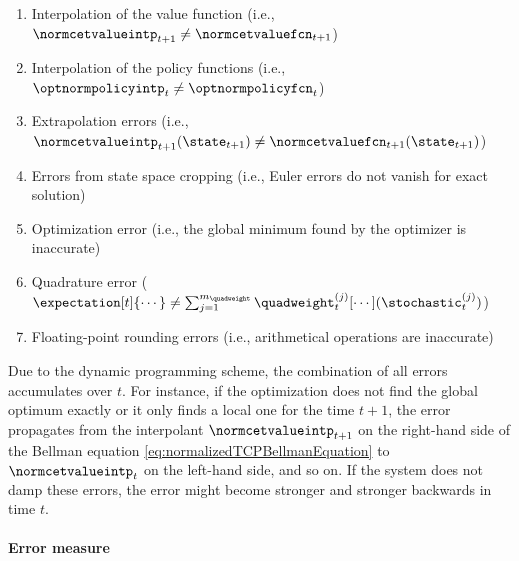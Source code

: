 \begin{enumerate}[label=E\arabic*.,ref=E\arabic*,leftmargin=2.7em]
  \item
  \label{item:financeErrorInterpolationValue}
  Interpolation of the value function
  (i.e., $\normcetvalueintp_{t+1} \not= \normcetvaluefcn_{t+1}$)
  
  \item
  \label{item:financeErrorInterpolationPolicy}
  Interpolation of the policy functions
  (i.e., $\optnormpolicyintp_t \not= \optnormpolicyfcn_t$)
  
  \item
  \label{item:financeErrorExtrapolation}
  Extrapolation errors
  (i.e., $
  \normcetvalueintp_{t+1}(\state_{t+1})
  \not= \normcetvaluefcn_{t+1}(\state_{t+1})
  $)
  
  \item
  \label{item:financeErrorCropping}
  Errors from state space cropping
  (i.e., Euler errors do not vanish for exact solution)
  
  \item
  \label{item:financeErrorOptimization}
  Optimization error
  (i.e., the global minimum found by the optimizer is inaccurate)
  
  \item
  \label{item:financeErrorQuadrature}
  Quadrature error
  ($
  \expectation[t]{\cdots}
  \not= \sum_{j=1}^{m_{\quadweight}} \quadweight_t^{(j)}
  [\cdots](\stochastic_t^{(j)})
  $)
  
  \item
  \label{item:financeErrorRounding}
  Floating-point rounding errors
  (i.e., arithmetical operations are inaccurate)
\end{enumerate}
Due to the dynamic programming scheme,
the combination of all errors accumulates over $t$.
For instance, if the optimization does not find the global optimum
exactly or it only finds a local one for the time $t + 1$,
the error propagates from the interpolant $\normcetvalueintp_{t+1}$
on the right-hand side of the Bellman equation
\eqref{eq:normalizedTCPBellmanEquation} to $\normcetvalueintp_t$
on the left-hand side, and so on.
If the system does not damp these errors,
the error might become stronger and stronger backwards in time $t$.

\paragraph{Error measure}

